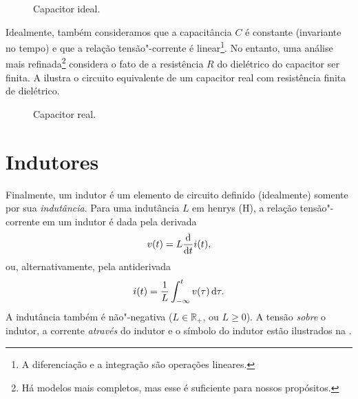 \begin{figure}
	\centering
	\caption{Capacitor ideal.}
	\label{fig:capacitor}
\end{figure}

Idealmente, também consideramos que a capacitância $C$ é constante (invariante no tempo) e que a relação tensão"-corrente é linear\footnote{A diferenciação e a integração são operações lineares.}. No entanto, uma análise mais refinada\footnote{Há modelos mais completos, mas esse é suficiente para nossos propósitos.} considera o fato de a resistência $R$ do dielétrico do capacitor ser finita. A  ilustra o circuito equivalente de um capacitor real com resistência finita de dielétrico.

\begin{figure}
	\centering
	\caption{Capacitor real.}
	\label{fig:capacitorReal}
\end{figure}

\section{Indutores}
Finalmente, um indutor é um elemento de circuito definido (idealmente) somente por sua \emph{indutância}. Para uma indutância $L$ em henrys (\unit{\henry}), a relação tensão"-corrente em um indutor é dada pela derivada
\begin{equation*}
	v(t)=L\diff{i(t)}{t},
\end{equation*}
ou, alternativamente, pela antiderivada
\begin{equation*}
	i(t)=\frac{1}{L}\intd{v(\tau)}{\tau}{-\infty}{t}.
\end{equation*}
A indutância também é não"-negativa ($L\in\mathbb{R}_+$, ou $L\geq0$). A tensão \emph{sobre} o indutor, a corrente \emph{através} do indutor e o símbolo do indutor estão ilustrados na .

